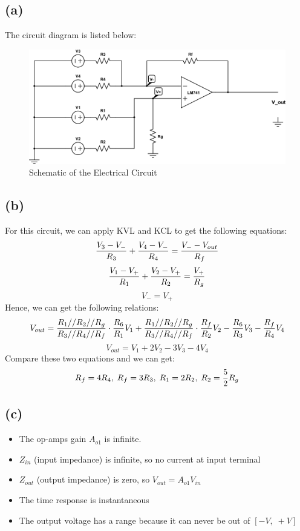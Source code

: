 \documentclass[letterpaper]{article}
\begin{document}
\subsection*{(a)}
The circuit diagram is listed below:
\begin{figure}[H]
	\centering
	\includegraphics[width=13cm]{q2_circuitDiagram.png}
	\caption{Schematic of the Electrical Circuit}
	\label{fig:circuit2}
\end{figure}

\hspace*{3em}
\subsection*{(b)}
For this circuit, we can apply KVL and KCL to get the following equations:
$$\frac{\displaystyle V_3 - V_-}{\displaystyle R_3} + \frac{\displaystyle V_4 - V_-}{\displaystyle R_4} = \frac{\displaystyle V_- - V_{out}}{\displaystyle R_f}$$
$$\frac{\displaystyle V_1 - V_+}{\displaystyle R_1} + \frac{\displaystyle V_2 - V_+}{\displaystyle R_2} = \frac{\displaystyle V_+}{\displaystyle R_g}$$
$$V_- = V_+$$
Hence, we can get the following relations:
$$V_{out} = \frac{\displaystyle R_1//R_2//R_g}{\displaystyle R_3//R_4//R_f}\cdot\frac{\displaystyle R_6}{\displaystyle R_1}V_1 + \frac{\displaystyle R_1//R_2//R_g}{\displaystyle R_3//R_4//R_f}\cdot\frac{\displaystyle R_f}{\displaystyle R_2}V_2 - \frac{\displaystyle R_6}{\displaystyle R_3}V_3 -\frac{\displaystyle R_f}{\displaystyle R_4}V_4$$
$$V_{out} = V_1 + 2V_2 - 3V_3 -4V_4$$
Compare these two equations and we can get:
$$R_f = 4R_4,\; R_f = 3R_3,\; R_1 = 2R_2,\; R_2 = \frac{\displaystyle 5}{\displaystyle 2}R_g$$
\subsection*{(c)}
\begin{itemize}
	\item The op-amps gain $A_{o1}$ is infinite.
	\item $Z_{in}$ (input impedance) is infinite, so no current at input terminal
	\item $Z_{out}$ (output impedance) is zero, so $V_{out} = A_{o1}V_{in}$
	\item The time response is instantaneous
	\item The output voltage has a range because it can never be out of $[-V,\; +V]$
\end{itemize}
\end{document}
